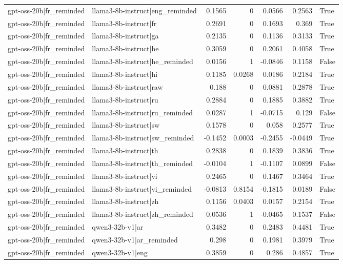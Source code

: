 \begin{table}
\begin{tabular}{l l r r r r l}
gpt-oss-20b|fr_reminded & llama3-8b-instruct|eng_reminded & 0.1565 & 0 & 0.0566 & 0.2563 & True \\
gpt-oss-20b|fr_reminded & llama3-8b-instruct|fr & 0.2691 & 0 & 0.1693 & 0.369 & True \\
gpt-oss-20b|fr_reminded & llama3-8b-instruct|ga & 0.2135 & 0 & 0.1136 & 0.3133 & True \\
gpt-oss-20b|fr_reminded & llama3-8b-instruct|he & 0.3059 & 0 & 0.2061 & 0.4058 & True \\
gpt-oss-20b|fr_reminded & llama3-8b-instruct|he_reminded & 0.0156 & 1 & -0.0846 & 0.1158 & False \\
gpt-oss-20b|fr_reminded & llama3-8b-instruct|hi & 0.1185 & 0.0268 & 0.0186 & 0.2184 & True \\
gpt-oss-20b|fr_reminded & llama3-8b-instruct|raw & 0.188 & 0 & 0.0881 & 0.2878 & True \\
gpt-oss-20b|fr_reminded & llama3-8b-instruct|ru & 0.2884 & 0 & 0.1885 & 0.3882 & True \\
gpt-oss-20b|fr_reminded & llama3-8b-instruct|ru_reminded & 0.0287 & 1 & -0.0715 & 0.129 & False \\
gpt-oss-20b|fr_reminded & llama3-8b-instruct|sw & 0.1578 & 0 & 0.058 & 0.2577 & True \\
gpt-oss-20b|fr_reminded & llama3-8b-instruct|sw_reminded & -0.1452 & 0.0003 & -0.2455 & -0.0449 & True \\
gpt-oss-20b|fr_reminded & llama3-8b-instruct|th & 0.2838 & 0 & 0.1839 & 0.3836 & True \\
gpt-oss-20b|fr_reminded & llama3-8b-instruct|th_reminded & -0.0104 & 1 & -0.1107 & 0.0899 & False \\
gpt-oss-20b|fr_reminded & llama3-8b-instruct|vi & 0.2465 & 0 & 0.1467 & 0.3464 & True \\
gpt-oss-20b|fr_reminded & llama3-8b-instruct|vi_reminded & -0.0813 & 0.8154 & -0.1815 & 0.0189 & False \\
gpt-oss-20b|fr_reminded & llama3-8b-instruct|zh & 0.1156 & 0.0403 & 0.0157 & 0.2154 & True \\
gpt-oss-20b|fr_reminded & llama3-8b-instruct|zh_reminded & 0.0536 & 1 & -0.0465 & 0.1537 & False \\
gpt-oss-20b|fr_reminded & qwen3-32b-v1|ar & 0.3482 & 0 & 0.2483 & 0.4481 & True \\
gpt-oss-20b|fr_reminded & qwen3-32b-v1|ar_reminded & 0.298 & 0 & 0.1981 & 0.3979 & True \\
gpt-oss-20b|fr_reminded & qwen3-32b-v1|eng & 0.3859 & 0 & 0.286 & 0.4857 & True \\

\end{tabular}
\end{table}
